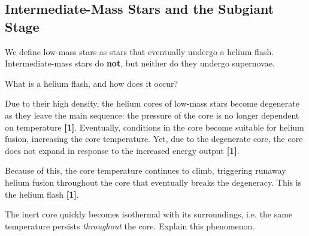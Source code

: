 \documentclass[a4paper,11pt]{exam}
\begin{document}
\begin{questions}
{\filbreak
\subsection*{Intermediate-Mass Stars and the Subgiant Stage}\vspace*{-10pt}}

\question[3]
	We define low-mass stars as stars that eventually undergo a helium flash. Intermediate-mass stars do \textbf{not}, but neither do they undergo supernovae.
	
	What is a helium flash, and how does it occur? 
	\droppoints
	\begin{solution}
		Due to their high density, the helium cores of low-mass stars become degenerate as they leave the main sequence: the pressure of the core is no longer dependent on temperature \textbf{[1]}. Eventually, conditions in the core become suitable for helium fusion, increasing the core temperature. Yet, due to the degenerate core, the core does not expand in response to the increased energy output \textbf{[1]}. 
		
		Because of this, the core temperature continues to climb, triggering runaway helium fusion throughout the core that eventually breaks the degeneracy. This is the helium flash \textbf{[1]}. 
	\end{solution}
	

\filbreak
\question[2]\label{q2c}
	The inert core quickly becomes isothermal with its surroundings, i.e. the same temperature persists \textit{throughout} the core. Explain this phenomenon.
	\droppoints
	

\end{questions}
\end{document}
